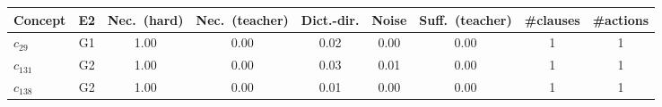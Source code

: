 \begin{tabular}{lcccccccc}
\toprule
Concept & E2 & Nec.\ (hard) & Nec.\ (teacher) & Dict.-dir. & Noise & Suff.\ (teacher) & \#clauses & \#actions \\
\midrule
$c_{29}$ & G1 & 1.00 & 0.00 & 0.02 & 0.00 & 0.00 & 1 & 1 \\
$c_{131}$ & G2 & 1.00 & 0.00 & 0.03 & 0.01 & 0.00 & 1 & 1 \\
$c_{138}$ & G2 & 1.00 & 0.00 & 0.01 & 0.00 & 0.00 & 1 & 1 \\
\bottomrule
\end{tabular}